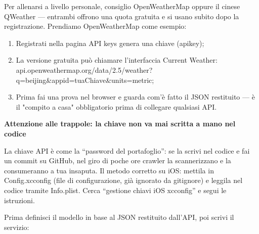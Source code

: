 


Per allenarsi a livello personale, consiglio OpenWeatherMap oppure il cinese QWeather — entrambi offrono una quota gratuita e si usano subito dopo la registrazione. Prendiamo OpenWeatherMap come esempio:

\begin{enumerate}
  \item Registrati nella pagina API keys genera una chiave (apikey);
  \item La versione gratuita può chiamare l'interfaccia Current Weather: api.openweathermap.org/data/2.5/weather? q=beijing\&appid=tuaChiave\&units=metric;
  \item Prima fai una prova nel browser e guarda com'è fatto il JSON restituito — è il "compito a casa" obbligatorio prima di collegare qualsiasi API.
\end{enumerate}

\textbf{Attenzione alle trappole: la chiave non va mai scritta a mano nel codice}\par

La chiave API è come la “password del portafoglio”: se la scrivi nel codice e fai un commit su GitHub, nel giro di poche ore crawler la scannerizzano e la consumeranno a tua insaputa. Il metodo corretto su iOS: mettila in Config.xcconfig (file di configurazione, già ignorato da gitignore) e leggila nel codice tramite Info.plist. Cerca “gestione chiavi iOS xcconfig” e segui le istruzioni.


Prima definisci il modello in base al JSON restituito dall'API, poi scrivi il servizio:

